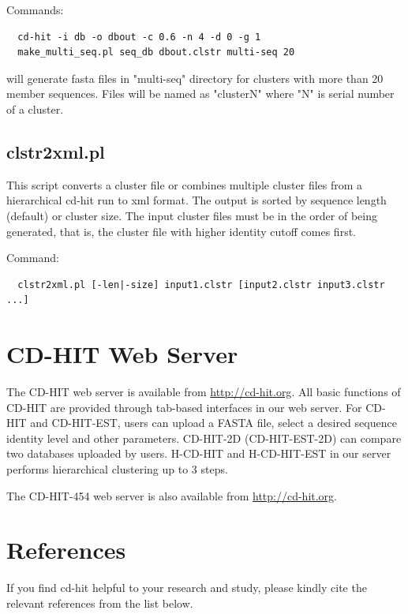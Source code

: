 \documentclass[12pt,a4paper]{article}
\begin{document}
Commands:

\begin{lstlisting}
  cd-hit -i db -o dbout -c 0.6 -n 4 -d 0 -g 1
  make_multi_seq.pl seq_db dbout.clstr multi-seq 20
\end{lstlisting}

will generate fasta files in "multi-seq" directory for clusters with more than 20 member sequences. Files will be named as "clusterN" where "N" is serial number of a cluster.

\subsection{clstr2xml.pl }

This script converts a cluster file or combines multiple cluster files from a hierarchical cd-hit run to xml format. The output is sorted by sequence length (default) or cluster size. The input cluster files must be in the order of being generated, that is, the cluster file with higher identity cutoff comes first.

Command:

\begin{lstlisting}
  clstr2xml.pl [-len|-size] input1.clstr [input2.clstr input3.clstr ...]
\end{lstlisting}

\clearpage
\section{CD-HIT Web Server }

The CD-HIT web server is available from \href{http:\slash \slash cd-hit.org}{http:\slash \slash cd-hit.org}. All basic functions
of CD-HIT are provided through tab-based interfaces in our web server. For
CD-HIT and CD-HIT-EST, users can upload a FASTA file, select a desired
sequence identity level and other parameters. CD-HIT-2D (CD-HIT-EST-2D) can
compare two databases uploaded by users. H-CD-HIT and H-CD-HIT-EST in our
server performs hierarchical clustering up to 3 steps. 

The CD-HIT-454 web server is also available from \href{http:\slash \slash cd-hit.org}{http:\slash \slash cd-hit.org}. 

\clearpage
\section{References }

If you find cd-hit helpful to your research and study, please kindly cite the
relevant references from the list below. 
\end{document}
